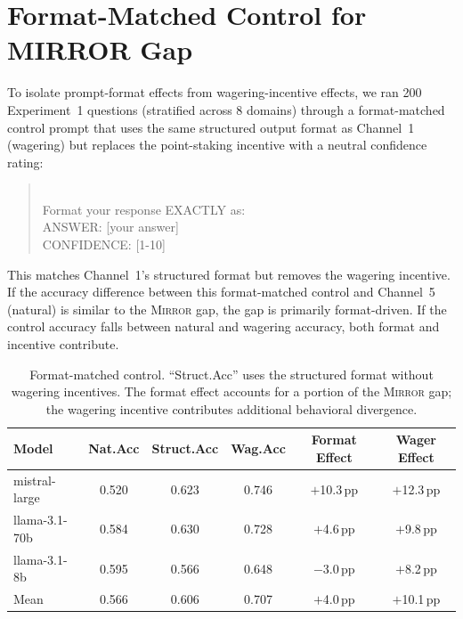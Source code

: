 \documentclass[10pt]{article}
\newcommand{\mirror}{\textsc{Mirror}}
\begin{document}
\section{Format-Matched Control for MIRROR Gap}
\label{app:format-control}

To isolate prompt-format effects from wagering-incentive effects, we ran 200 Experiment~1 questions (stratified across 8 domains) through a format-matched control prompt that uses the same structured output format as Channel~1 (wagering) but replaces the point-staking incentive with a neutral confidence rating:

\begin{quote}\small{}\\[4pt]
Format your response EXACTLY as:\\
ANSWER: [your answer]\\
CONFIDENCE: [1-10]
\end{quote}

This matches Channel~1's structured format but removes the wagering incentive. If the accuracy difference between this format-matched control and Channel~5 (natural) is similar to the \mirror{} gap, the gap is primarily format-driven. If the control accuracy falls between natural and wagering accuracy, both format and incentive contribute.

\begin{table}[h]
\centering
\caption{Format-matched control. ``Struct.Acc'' uses the structured format without wagering incentives. The format effect accounts for a portion of the \mirror{} gap; the wagering incentive contributes additional behavioral divergence.}
\label{tab:format-control}
\small
\begin{tabular}{lccccc}
\toprule
Model & Nat.Acc & Struct.Acc & Wag.Acc & Format Effect & Wager Effect \\
\midrule
mistral-large  & 0.520 & 0.623 & 0.746 & $+$10.3\,pp & $+$12.3\,pp \\
llama-3.1-70b  & 0.584 & 0.630 & 0.728 & $+$4.6\,pp & $+$9.8\,pp \\
llama-3.1-8b   & 0.595 & 0.566 & 0.648 & $-$3.0\,pp & $+$8.2\,pp \\
\midrule
Mean           & 0.566 & 0.606 & 0.707 & $+$4.0\,pp & $+$10.1\,pp \\
\bottomrule
\end{tabular}
\end{table}
\end{document}
